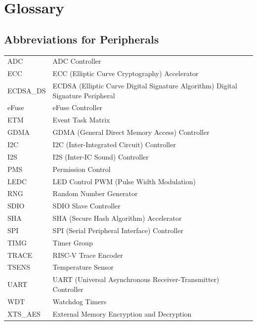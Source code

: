 \section*{Glossary}\label{glossary}
\rhead{\Navigation}

\subsection*{Abbreviations for Peripherals}

\begin{longtable}[c]{ R{3cm} p{12cm} }

ADC     & ADC Controller \\
ECC     & ECC (Elliptic Curve Cryptography) Accelerator  \\
ECDSA\_DS   & ECDSA (Elliptic Curve Digital Signature Algorithm) Digital Signature Peripheral  \\
eFuse   & eFuse Controller \\ 
ETM     & Event Task Matrix \\
GDMA    & GDMA (General Direct Memory Access) Controller \\
I2C     & I2C (Inter-Integrated Circuit) Controller \\ 
I2S     & I2S (Inter-IC Sound) Controller \\
PMS     & Permission Control \\
LEDC    & LED Control PWM (Pulse Width Modulation)\\ 
RNG     & Random Number Generator \\
SDIO    & SDIO Slave Controller \\ 
SHA     & SHA (Secure Hash Algorithm) Accelerator \\
SPI     & SPI (Serial Peripheral Interface) Controller \\
TIMG    & Timer Group \\
TRACE   & RISC-V Trace Encoder \\
TSENS   & Temperature Sensor \\
UART    & UART (Universal Asynchronous Receiver-Transmitter) Controller \\ 
WDT     & Watchdog Timers \\
XTS\_AES & External Memory Encryption and Decryption \\

\end{longtable}








